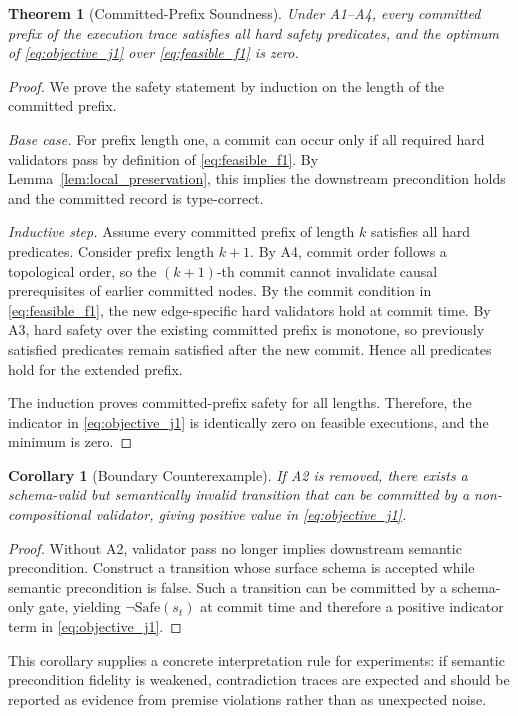 \documentclass{article} %
\newtheorem{theorem}{Theorem}[section]
\newtheorem{corollary}{Corollary}[theorem]
\begin{document}
\begin{theorem}[Committed-Prefix Soundness]
\label{thm:prefix_soundness}
Under A1--A4, every committed prefix of the execution trace satisfies all hard safety predicates, and the optimum of \eqref{eq:objective_j1} over \eqref{eq:feasible_f1} is zero.
\end{theorem}
\begin{proof}
We prove the safety statement by induction on the length of the committed prefix.

\textit{Base case.} For prefix length one, a commit can occur only if all required hard validators pass by definition of \eqref{eq:feasible_f1}. By Lemma~\ref{lem:local_preservation}, this implies the downstream precondition holds and the committed record is type-correct.

\textit{Inductive step.} Assume every committed prefix of length $k$ satisfies all hard predicates. Consider prefix length $k+1$. By A4, commit order follows a topological order, so the $(k+1)$-th commit cannot invalidate causal prerequisites of earlier committed nodes. By the commit condition in \eqref{eq:feasible_f1}, the new edge-specific hard validators hold at commit time. By A3, hard safety over the existing committed prefix is monotone, so previously satisfied predicates remain satisfied after the new commit. Hence all predicates hold for the extended prefix.

The induction proves committed-prefix safety for all lengths. Therefore, the indicator in \eqref{eq:objective_j1} is identically zero on feasible executions, and the minimum is zero.\qedhere
\end{proof}

\begin{corollary}[Boundary Counterexample]
\label{cor:ce1}
If A2 is removed, there exists a schema-valid but semantically invalid transition that can be committed by a non-compositional validator, giving positive value in \eqref{eq:objective_j1}.
\end{corollary}
\begin{proof}
Without A2, validator pass no longer implies downstream semantic precondition. Construct a transition whose surface schema is accepted while semantic precondition is false. Such a transition can be committed by a schema-only gate, yielding $\neg\mathrm{Safe}(s_t)$ at commit time and therefore a positive indicator term in \eqref{eq:objective_j1}.\qedhere
\end{proof}
This corollary supplies a concrete interpretation rule for experiments: if semantic precondition fidelity is weakened, contradiction traces are expected and should be reported as evidence from premise violations rather than as unexpected noise.
\end{document}
